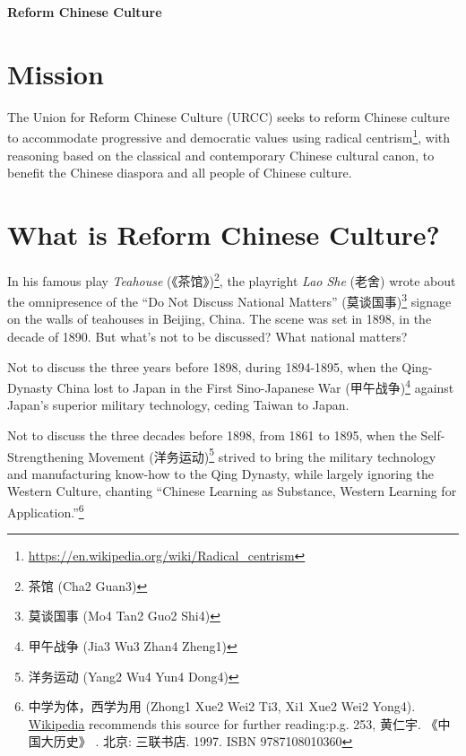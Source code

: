 \documentclass[8pt]{article}
\begin{document}
\begin{center}
    {\Huge\bfseries\color{titlecolor} Reform Chinese Culture}\\[0.5cm]
\end{center}

\vspace{2cm}

\section{Mission}

The Union for Reform Chinese Culture (URCC) seeks to reform Chinese culture to accommodate progressive and democratic values using radical centrism\footnote{\href{https://en.wikipedia.org/wiki/Radical\_centrism}{https://en.wikipedia.org/wiki/Radical\_centrism}}, with reasoning based on the classical and contemporary Chinese cultural canon, to benefit the Chinese diaspora and all people of Chinese culture.

\section{What is Reform Chinese Culture?}

In his famous play \textit{Teahouse} (《茶馆》)\footnote{茶馆 (Cha2 Guan3)}, the playright \textit{Lao She} (老舍) wrote about the omnipresence of the ``Do Not Discuss National Matters'' (莫谈国事)\footnote{莫谈国事 (Mo4 Tan2 Guo2 Shi4)} signage on the walls of teahouses in Beijing, China. The scene was set in 1898, in the decade of 1890. But what's not to be discussed? What national matters?

Not to discuss the three years before 1898, during 1894-1895, when the Qing-Dynasty China lost to Japan in the First Sino-Japanese War (甲午战争)\footnote{甲午战争 (Jia3 Wu3 Zhan4 Zheng1)} against Japan's superior military technology, ceding Taiwan to Japan.

Not to discuss the three decades before 1898, from 1861 to 1895, when the Self-Strengthening Movement (洋务运动)\footnote{洋务运动 (Yang2 Wu4 Yun4 Dong4)} strived to bring the military technology and manufacturing know-how to the Qing Dynasty, while largely ignoring the Western Culture, chanting ``Chinese Learning as Substance, Western Learning for Application.''\footnote{中学为体，西学为用 (Zhong1 Xue2 Wei2 Ti3, Xi1 Xue2 Wei2 Yong4). \href{https://zh.wikipedia.org/wiki/\%E6\%B4\%8B\%E5\%8A\%A1\%E8\%BF\%90\%E5\%8A\%A8\#cite\_ref-\%E9\%BB\%83\_17-0}{Wikipedia} recommends this source for further reading:p.g. 253, 黄仁宇. 《中国大历史》 . 北京: 三联书店. 1997. ISBN 9787108010360}
\end{document}
